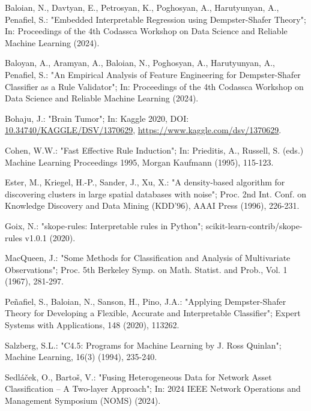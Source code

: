 \documentclass[10pt,a4paper,oneside]{article}
\begin{document}
\begin{thebibliography}{}{
\fontsize{9pt}{10pt}\selectfont
{}
Baloian, N., Davtyan, E., Petrosyan, K., Poghosyan, A., Harutyunyan, A., Penafiel, S.:
"Embedded Interpretable Regression using Dempster-Shafer Theory";
In: Proceedings of the 4th Codassca Workshop on Data Science and Reliable Machine Learning (2024).

Baloyan, A., Aramyan, A., Baloian, N., Poghosyan, A., Harutyunyan, A., Penafiel, S.:
"An Empirical Analysis of Feature Engineering for Dempster-Shafer Classifier as a Rule Validator";
In: Proceedings of the 4th Codassca Workshop on Data Science and Reliable Machine Learning (2024).

Bohaju, J.: "Brain Tumor";
In: Kaggle 2020, DOI: \url{10.34740/KAGGLE/DSV/1370629}, \url{https://www.kaggle.com/dsv/1370629}.

Cohen, W.W.: "Fast Effective Rule Induction";
In: Prieditis, A., Russell, S. (eds.) Machine Learning Proceedings 1995,
Morgan Kaufmann (1995), 115-123.

Ester, M., Kriegel, H.-P., Sander, J., Xu, X.:
"A density-based algorithm for discovering clusters in large spatial databases with noise";
Proc. 2nd Int. Conf. on Knowledge Discovery and Data Mining (KDD'96), AAAI Press (1996), 226-231.

Goix, N.: "skope-rules: Interpretable rules in Python";
scikit-learn-contrib/skope-rules v1.0.1 (2020).

MacQueen, J.: "Some Methods for Classification and Analysis of Multivariate Observations";
Proc. 5th Berkeley Symp. on Math. Statist. and Prob., Vol. 1 (1967), 281-297.

Peñafiel, S., Baloian, N., Sanson, H., Pino, J.A.: "Applying Dempster-Shafer Theory for Developing a Flexible, Accurate and Interpretable Classifier";
Expert Systems with Applications, 148 (2020), 113262.

Salzberg, S.L.: "C4.5: Programs for Machine Learning by J. Ross Quinlan";
Machine Learning, 16(3) (1994), 235-240.

Sedláček, O., Bartoš, V.: "Fusing Heterogeneous Data for Network Asset Classification – A Two-layer Approach";
In: 2024 IEEE Network Operations and Management Symposium (NOMS) (2024).

}
\end{thebibliography}
\end{document}
